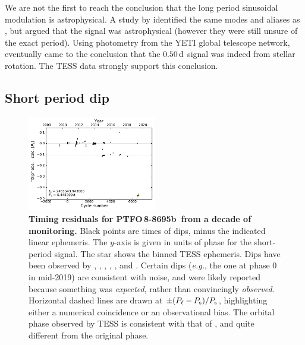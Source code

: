 \documentclass[12pt,twocolumn,tighten]{aastex62}
\newcommand{\ptfob}{PTFO$\,$8-8695b}
\begin{document}
We are not the first to reach the conclusion that the long period
sinusoidal modulation is astrophysical.  A study by
\citet{koen_multicolour_2015} identified the same modes and aliases as
\citet{van_eyken_ptf_2012}, but argued that the signal was
astrophysical (however they were still unsure of the exact period).
Using photometry from the YETI global telescope network,
\citet{raetz_yeti_2016} eventually came to the conclusion that the
$0.50\,{\rm d}$ signal was indeed from stellar rotation.  The TESS
data strongly support this conclusion.



\subsection{Short period dip}

\begin{figure}[t]
	\begin{center}
		\leavevmode
		\includegraphics[width=0.5\textwidth]{f6.pdf}
	\end{center}
	\vspace{-0.7cm}
	\caption{
		{\bf Timing residuals for \ptfob\ from a decade of monitoring.}
		Black points are times of dips, minus the indicated linear
		ephemeris.  The $y$-axis is given in units of phase for the
		short-period signal.  The star shows the binned TESS ephemeris.
		Dips have been observed by \citet{van_eyken_ptf_2012},
		\citet{ciardi_followup_2015}, \citet{yu_tests_2015},
		\citet{raetz_yeti_2016}, \citet{onitsuka_multicolor_2017}, and
		\citet{tanimoto_evidence_2020}.  Certain dips ({\it e.g.}, the one
		at phase 0 in mid-2019) are consistent with noise, and were likely
		reported because something was {\it expected}, rather than
		convincingly {\it observed}.  Horizontal dashed lines are drawn at
		$\pm (P_{\rm \ell} - P_{\rm s})/P_{\rm s}$, highlighting either a
		numerical coincidence or an observational bias.  The orbital phase
		observed by TESS is consistent with that of
		\citet{tanimoto_evidence_2020}, and quite different from the
		original phase.
		\label{fig:o_minus_c}
	}
\end{figure}
\end{document}
